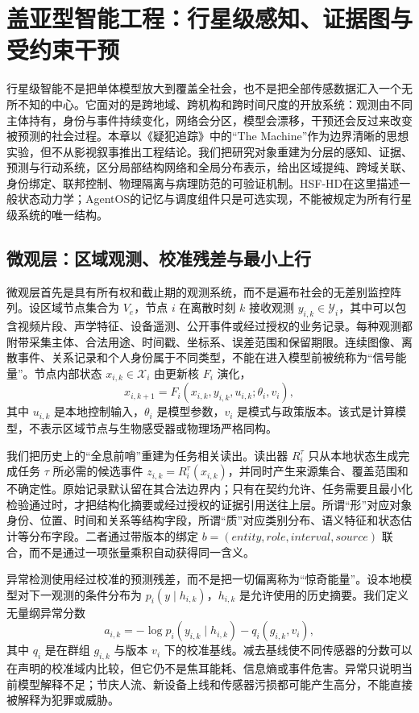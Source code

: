 \chapter{盖亚型智能工程：行星级感知、证据图与受约束干预}
\label{chp:gaia_engineering_the_machine}

行星级智能不是把单体模型放大到覆盖全社会，也不是把全部传感数据汇入一个无所不知的中心。它面对的是跨地域、跨机构和跨时间尺度的开放系统：观测由不同主体持有，身份与事件持续变化，网络会分区，模型会漂移，干预还会反过来改变被预测的社会过程。本章以《疑犯追踪》中的“The Machine”作为边界清晰的思想实验，但不从影视叙事推出工程结论。我们把研究对象重建为分层的感知、证据、预测与行动系统，区分局部结构网络和全局分布表示，给出区域提纯、跨域关联、身份绑定、联邦控制、物理隔离与病理防范的可验证机制。HSF-HD在这里描述一般状态动力学；AgentOS的记忆与调度组件只是可选实现，不能被规定为所有行星级系统的唯一结构。

\section{微观层：区域观测、校准残差与最小上行}
\label{sec:gaia_micro_layer}

微观层首先是具有所有权和截止期的观测系统，而不是遍布社会的无差别监控阵列。设区域节点集合为 $V_e$，节点 $i$ 在离散时刻 $k$ 接收观测 $y_{i,k}\in\mathcal Y_i$，其中可以包含视频片段、声学特征、设备遥测、公开事件或经过授权的业务记录。每种观测都附带采集主体、合法用途、时间戳、坐标系、误差范围和保留期限。连续图像、离散事件、关系记录和个人身份属于不同类型，不能在进入模型前被统称为“信号能量”。节点内部状态 $x_{i,k}\in\mathcal X_i$ 由更新核 $F_i$ 演化，
\begin{equation}
 x_{i,k+1}=F_i(x_{i,k},y_{i,k},u_{i,k};\theta_i,v_i),
\end{equation}
其中 $u_{i,k}$ 是本地控制输入，$\theta_i$ 是模型参数，$v_i$ 是模式与政策版本。该式是计算模型，不表示区域节点与生物感受器或物理场严格同构。

我们把历史上的“全息前哨”重建为任务相关读出。读出器 $R_i^\tau$ 只从本地状态生成完成任务 $\tau$ 所必需的候选事件 $z_{i,k}=R_i^\tau(x_{i,k})$，并同时产生来源集合、覆盖范围和不确定性。原始记录默认留在其合法边界内；只有在契约允许、任务需要且最小化检验通过时，才把结构化摘要或经过授权的证据引用送往上层。所谓“形”对应对象身份、位置、时间和关系等结构字段，所谓“质”对应类别分布、语义特征和状态估计等分布字段。二者通过带版本的绑定 $b=(entity,role,interval,source)$ 联合，而不是通过一项张量乘积自动获得同一含义。

异常检测使用经过校准的预测残差，而不是把一切偏离称为“惊奇能量”。设本地模型对下一观测的条件分布为 $p_i(y\mid h_{i,k})$，$h_{i,k}$ 是允许使用的历史摘要。我们定义无量纲异常分数
\begin{equation}
 a_{i,k}=-\log p_i(y_{i,k}\mid h_{i,k})-q_i(g_{i,k},v_i),
\end{equation}
其中 $q_i$ 是在群组 $g_{i,k}$ 与版本 $v_i$ 下的校准基线。减去基线使不同传感器的分数可以在声明的校准域内比较，但它仍不是焦耳能耗、信息熵或事件危害。异常只说明当前模型解释不足；节庆人流、新设备上线和传感器污损都可能产生高分，不能直接被解释为犯罪或威胁。

